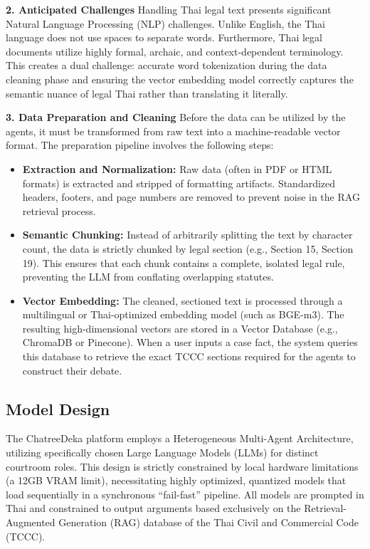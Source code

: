 \textbf{2. Anticipated Challenges}
Handling Thai legal text presents significant Natural Language Processing (NLP) challenges. Unlike English, the Thai language does not use spaces to separate words. Furthermore, Thai legal documents utilize highly formal, archaic, and context-dependent terminology. This creates a dual challenge: accurate word tokenization during the data cleaning phase and ensuring the vector embedding model correctly captures the semantic nuance of legal Thai rather than translating it literally.

\textbf{3. Data Preparation and Cleaning}
Before the data can be utilized by the agents, it must be transformed from raw text into a machine-readable vector format. The preparation pipeline involves the following steps:
\begin{itemize}
    \item \textbf{Extraction and Normalization:} Raw data (often in PDF or HTML formats) is extracted and stripped of formatting artifacts. Standardized headers, footers, and page numbers are removed to prevent noise in the RAG retrieval process.
    \item \textbf{Semantic Chunking:} Instead of arbitrarily splitting the text by character count, the data is strictly chunked by legal section (e.g., Section 15, Section 19). This ensures that each chunk contains a complete, isolated legal rule, preventing the LLM from conflating overlapping statutes.
    \item \textbf{Vector Embedding:} The cleaned, sectioned text is processed through a multilingual or Thai-optimized embedding model (such as BGE-m3). The resulting high-dimensional vectors are stored in a Vector Database (e.g., ChromaDB or Pinecone). When a user inputs a case fact, the system queries this database to retrieve the exact TCCC sections required for the agents to construct their debate.
\end{itemize}
\subsection{Model Design}
\label{subsection:model-design}
The ChatreeDeka platform employs a Heterogeneous Multi-Agent Architecture, utilizing specifically chosen Large Language Models (LLMs) for distinct courtroom roles. This design is strictly constrained by local hardware limitations (a 12GB VRAM limit), necessitating highly optimized, quantized models that load sequentially in a synchronous ``fail-fast'' pipeline. All models are prompted in Thai and constrained to output arguments based exclusively on the Retrieval-Augmented Generation (RAG) database of the Thai Civil and Commercial Code (TCCC).

